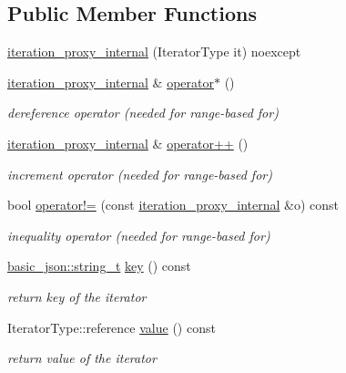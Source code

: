 \subsection*{Public Member Functions}
\begin{DoxyCompactItemize}
\item 
\hyperlink{classnlohmann_1_1basic__json_1_1iteration__proxy_1_1iteration__proxy__internal_aa622d1520df5e19013eeec55c9dfe01e}{iteration\+\_\+proxy\+\_\+internal} (Iterator\+Type it) noexcept
\item 
\hyperlink{classnlohmann_1_1basic__json_1_1iteration__proxy_1_1iteration__proxy__internal}{iteration\+\_\+proxy\+\_\+internal} \& \hyperlink{classnlohmann_1_1basic__json_1_1iteration__proxy_1_1iteration__proxy__internal_a6c3fea9291d981433c6be1691242be4b}{operator$\ast$} ()
\begin{DoxyCompactList}\small\item\em dereference operator (needed for range-\/based for) \end{DoxyCompactList}\item 
\hyperlink{classnlohmann_1_1basic__json_1_1iteration__proxy_1_1iteration__proxy__internal}{iteration\+\_\+proxy\+\_\+internal} \& \hyperlink{classnlohmann_1_1basic__json_1_1iteration__proxy_1_1iteration__proxy__internal_a54aa384e30ee304e347d3b046f1dc6f8}{operator++} ()
\begin{DoxyCompactList}\small\item\em increment operator (needed for range-\/based for) \end{DoxyCompactList}\item 
bool \hyperlink{classnlohmann_1_1basic__json_1_1iteration__proxy_1_1iteration__proxy__internal_ac0c280ff3ade3a04e6ffe5fa57ed7359}{operator!=} (const \hyperlink{classnlohmann_1_1basic__json_1_1iteration__proxy_1_1iteration__proxy__internal}{iteration\+\_\+proxy\+\_\+internal} \&o) const
\begin{DoxyCompactList}\small\item\em inequality operator (needed for range-\/based for) \end{DoxyCompactList}\item 
\hyperlink{classnlohmann_1_1basic__json_a61f8566a1a85a424c7266fb531dca005}{basic\+\_\+json\+::string\+\_\+t} \hyperlink{classnlohmann_1_1basic__json_1_1iteration__proxy_1_1iteration__proxy__internal_abe2efa90ad735148537144a043a58f97}{key} () const
\begin{DoxyCompactList}\small\item\em return key of the iterator \end{DoxyCompactList}\item 
Iterator\+Type\+::reference \hyperlink{classnlohmann_1_1basic__json_1_1iteration__proxy_1_1iteration__proxy__internal_a1d1310beb3327c5c54c4bc1c4a1c62b8}{value} () const
\begin{DoxyCompactList}\small\item\em return value of the iterator \end{DoxyCompactList}\end{DoxyCompactItemize}
